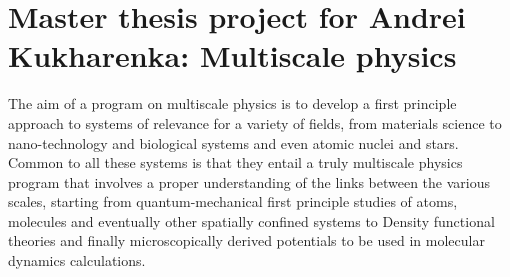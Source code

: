\documentclass[10pt]{article}
\begin{document}
\section*{Master thesis project for Andrei Kukharenka: Multiscale physics}

The aim of a program on multiscale physics is to develop a first
principle approach to systems of relevance for a variety of fields,
from materials science to nano-technology and biological systems and
even atomic nuclei and stars.  Common to all these systems is that
they entail a truly multiscale physics program that involves a proper
understanding of the links between the various scales, starting from
quantum-mechanical first principle studies of atoms, molecules and
eventually other spatially confined systems to Density functional
theories and finally microscopically derived potentials to be used in
molecular dynamics calculations.
\end{document}
